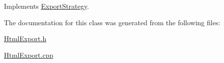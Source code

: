 Implements \hyperlink{class_export_strategy_a8f24eb340762e0c1b1faaefb32087468}{Export\-Strategy}.



The documentation for this class was generated from the following files\-:\begin{DoxyCompactItemize}
\item 
\hyperlink{_html_export_8h}{Html\-Export.\-h}\item 
\hyperlink{_html_export_8cpp}{Html\-Export.\-cpp}\end{DoxyCompactItemize}

